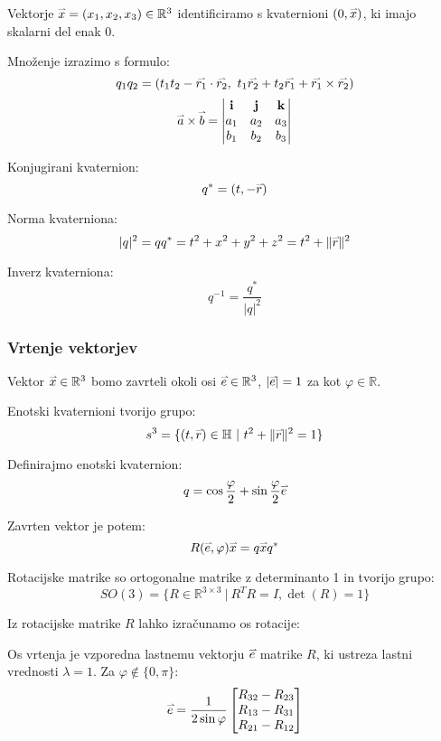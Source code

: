 Vektorje $\accentset{\rightharpoonup}{x} = (x_1, x_2, x_3) \in \mathbb{R}^3$ identificiramo s kvaternioni $(0, \accentset{\rightharpoonup}{x})$, ki imajo skalarni del enak 0. 

Množenje izrazimo s formulo:
\[ q_1 q_2 = (t_1 t_2 - \accentset{\rightharpoonup}{r_1}\cdot \accentset{\rightharpoonup}{r_2},\ t_1 \accentset{\rightharpoonup}{r_2} + t_2 \accentset{\rightharpoonup}{r_1} + \accentset{\rightharpoonup}{r_1} \times \accentset{\rightharpoonup}{r_2})\]
\begin{align*}
	\accentset{\rightharpoonup}{a} \times \accentset{\rightharpoonup}{b} = \begin{vmatrix}
		\mathbf{i} & \mathbf{j} & \mathbf{k} \\
		a_1 & a_2 & a_3 \\
		b_1 & b_2 & b_3 \\
	\end{vmatrix}
\end{align*}

Konjugirani kvaternion:
\[ q^* = (t, -\accentset{\rightharpoonup}{r})\]

Norma kvaterniona:
\[ |q|^2 = q q^* = t^2+x^2+y^2+z^2 = t^2+\|\accentset{\rightharpoonup}{r}\|^2\]

Inverz kvaterniona:
\[ q^{-1} = \frac{q^*}{|q|^2}\]

\subsubsection*{Vrtenje vektorjev}
Vektor $\accentset{\rightharpoonup}{x} \in \mathbb{R}^3$ bomo zavrteli okoli osi $\accentset{\rightharpoonup}{e} \in \mathbb{R}^3$, $|\accentset{\rightharpoonup}{e}| = 1$ za kot $\varphi \in \mathbb{R}$.

Enotski kvaternioni tvorijo grupo:
\[s^3 = \{(t, \accentset{\rightharpoonup}{r}) \in \mathbb{H}\ |\ t^2 + \| \accentset{\rightharpoonup}{r}\|^2 = 1\}\]

Definirajmo enotski kvaternion:
\[ q = \cos\frac{\varphi}{2} + \sin\frac{\varphi}{2} \accentset{\rightharpoonup}{e} \]

Zavrten vektor je potem:
\[ R(\accentset{\rightharpoonup}{e}, \varphi) \accentset{\rightharpoonup}{x} = q \accentset{\rightharpoonup}{x} q^*\]


Rotacijske matrike so ortogonalne matrike z determinanto 1 in tvorijo grupo:
\[SO(3) = \{ R \in \mathbb{R}^{3\times 3}\ |\ R^TR = I, \det(R) = 1\}\]

Iz rotacijske matrike $R$ lahko izračunamo os rotacije:

Os vrtenja je vzporedna lastnemu vektorju $\accentset{\rightharpoonup}{e}$ matrike $R$, ki ustreza lastni vrednosti $\lambda = 1$.
Za $\varphi \notin \{0, \pi\}$:
\[\accentset{\rightharpoonup}{e} = \frac{1}{2 \sin \varphi} \begin{bmatrix}
	R_{32}-R_{23} \\
	R_{13}-R_{31} \\
	R_{21}-R_{12} \\
\end{bmatrix}\]

